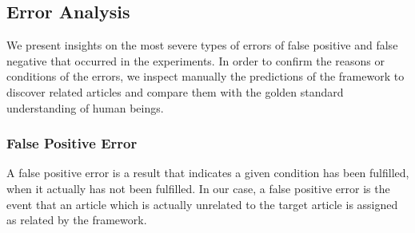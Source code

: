 \bigbreak

\subsection{Error Analysis}
\label{sec:5.5}

We present insights on the most severe types of errors of false positive and false negative that occurred in the experiments. In order to confirm the reasons or conditions of the errors, we inspect manually the predictions of the framework to discover related articles and compare them with the golden standard understanding of human beings.  

\subsubsection{False Positive Error}

A false positive error is a result that indicates a given condition has been fulfilled, when it actually has not been fulfilled. In our case, a false positive error is the event that an article which is actually unrelated to the target article is assigned as related by the framework. 

